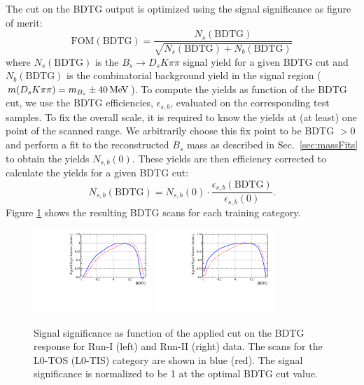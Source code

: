 The cut on the BDTG output is optimized using the signal significance as figure of merit:
\begin{equation}
	\text{FOM}(\text{BDTG}) = \frac{N_s(\text{BDTG})}{\sqrt{N_s (\text{BDTG})+ N_b(\text{BDTG})}}
\end{equation}
where $N_{s}(\text{BDTG})$ is the $B_s \to D_s K \pi \pi$ signal yield for a given BDTG cut and $N_{b}(\text{BDTG})$ is the combinatorial background yield in the signal region ($m(D_sK\pi\pi) = m_{B_s} \pm 40 \mathrm{\,Me\kern -0.1em V}$).
To compute the yields as function of the BDTG cut, we use the BDTG efficiencies, $\epsilon_{s,b}$, evaluated on the corresponding test samples.
To fix the overall scale, it is required to know the yields at (at least) one point of the scanned range.
We arbitrarily choose this fix point to be BDTG $> 0$ and perform a fit to the reconstructed $B_s$ mass as described in Sec.~\ref{sec:massFits} to obtain the yields $N_{s,b}(0)$.
These yields are then efficiency corrected to calculate the yields for a given BDTG cut: 
\begin{equation}
N_{s,b}(\text{BDTG}) = N_{s,b}(0) \cdot \frac{\epsilon_{s,b}(\text{BDTG})}{\epsilon_{s,b}(0)}.
\end{equation}
Figure \ref{fig:scanBDT} shows the resulting BDTG scans for each training category.
\begin{figure}[h]
\centering
\includegraphics[height=!,width=0.4\textwidth]{figs/TMVA/BDT_scan_Run1.pdf}
\includegraphics[height=!,width=0.4\textwidth]{figs/TMVA/BDT_scan_Run2.pdf}
\caption{Signal significance as function of the applied cut on the BDTG response for Run-I (left) and Run-II (right) data.
The scans for the \textsf{L0-TOS} (\textsf{L0-TIS}) category are shown in blue (red).
The signal significance is normalized to be 1 at the optimal BDTG cut value.
}
\label{fig:scanBDT}
\end{figure}


